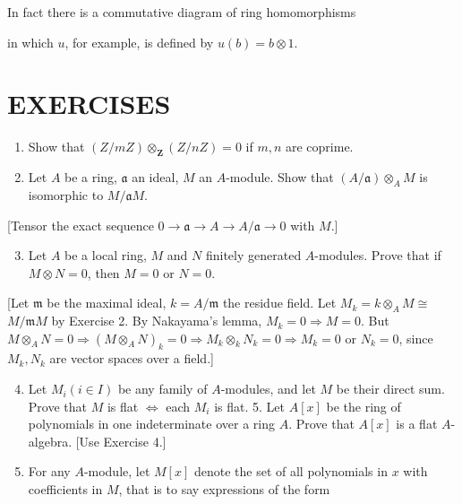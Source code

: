 \documentclass{standalone}
\theoremstyle{definition}
\theoremstyle{remark}
\begin{document}
In fact there is a commutative diagram of ring homomorphisms

\begin{center}
\end{center}

in which $u$, for example, is defined by $u(b)=b \otimes 1$.

\section{EXERCISES}
\begin{enumerate}
  \item Show that $(Z / m Z) \otimes_{\mathbf{Z}}(Z / n Z)=0$ if $m, n$ are coprime.

  \item Let $A$ be a ring, $\mathfrak{a}$ an ideal, $M$ an $A$-module. Show that $(A / \mathfrak{a}) \otimes_{A} M$ is isomorphic to $M / \mathfrak{a} M$.

\end{enumerate}

[Tensor the exact sequence $0 \rightarrow \mathfrak{a} \rightarrow A \rightarrow A / \mathfrak{a} \rightarrow 0$ with $M$.]

\begin{enumerate}
  \setcounter{enumi}{2}
  \item Let $A$ be a local ring, $M$ and $N$ finitely generated $A$-modules. Prove that if $M \otimes N=0$, then $M=0$ or $N=0$.
\end{enumerate}

[Let $\mathfrak{m}$ be the maximal ideal, $k=A / \mathfrak{m}$ the residue field. Let $M_{k}=k \otimes_{A} M \cong$ $M / \mathfrak{m} M$ by Exercise 2. By Nakayama's lemma, $M_{k}=0 \Rightarrow M=0$. But $M \otimes_{A} N=0 \Rightarrow\left(M \otimes_{A} N\right)_{k}=0 \Rightarrow M_{k} \otimes_{k} N_{k}=0 \Rightarrow M_{k}=0$ or $N_{k}=0$, since $M_{k}, N_{k}$ are vector spaces over a field.]

\begin{enumerate}
  \setcounter{enumi}{3}
  \item Let $M_{i}(i \in I)$ be any family of $A$-modules, and let $M$ be their direct sum. Prove that $M$ is flat $\Leftrightarrow$ each $M_{i}$ is flat. 5. Let $A[x]$ be the ring of polynomials in one indeterminate over a ring $A$. Prove that $A[x]$ is a flat $A$-algebra. [Use Exercise 4.]

  \item For any $A$-module, let $M[x]$ denote the set of all polynomials in $x$ with coefficients in $M$, that is to say expressions of the form

\end{enumerate}
\end{document}
